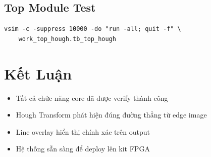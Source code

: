 \documentclass[12pt,a4paper]{article}
\begin{document}
\subsection{Top Module Test}
\begin{verbatim}
vsim -c -suppress 10000 -do "run -all; quit -f" \
    work_top_hough.tb_top_hough
\end{verbatim}

\section{Kết Luận}

\begin{itemize}
    \item Tất cả chức năng core đã được verify thành công
    \item Hough Transform phát hiện đúng đường thẳng từ edge image
    \item Line overlay hiển thị chính xác trên output
    \item Hệ thống sẵn sàng để deploy lên kit FPGA
\end{itemize}

\begin{center}
\end{center}
\end{document}
